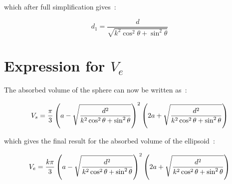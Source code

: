 which after full simplification gives~:

\begin{equation}
	d_1 = \frac{d}{\sqrt{k^2\cos^2\theta + \sin^2\theta} }
\end{equation}


\section{Expression for $V_e$}

The absorbed volume of the sphere can now be written as~:

\begin{equation}
	V_s = \frac{\pi}{3}
	\left(  a - \sqrt{\frac{d^2}{k^2\cos^2\theta + \sin^2\theta} } \right)^2
	\left( 2a + \sqrt{\frac{d^2}{k^2\cos^2\theta + \sin^2\theta} } \right)
\end{equation}


which gives the final result for the absorbed volume of the ellipsoid~:

\begin{equation}
	V_e = \frac{k\pi}{3}
	\left(  a - \sqrt{\frac{d^2}{k^2\cos^2\theta + \sin^2\theta} } \right)^2
	\left( 2a + \sqrt{\frac{d^2}{k^2\cos^2\theta + \sin^2\theta} } \right)
\end{equation}
